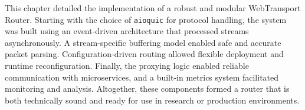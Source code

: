 This chapter detailed the implementation of a robust and modular WebTransport Router. Starting with the choice of \texttt{aioquic} for protocol handling, the system was built using an event-driven architecture that processed streams asynchronously. A stream-specific buffering model enabled safe and accurate packet parsing. Configuration-driven routing allowed flexible deployment and runtime reconfiguration. Finally, the proxying logic enabled reliable communication with microservices, and a built-in metrics system facilitated monitoring and analysis. Altogether, these components formed a router that is both technically sound and ready for use in research or production environments.




















